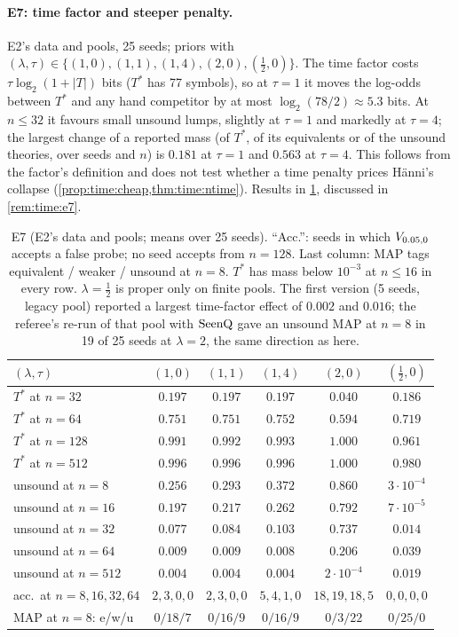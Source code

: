 \paragraph{E7: time factor and steeper penalty.} E2's data and pools, 25 seeds; priors with $(\lambda,\tau)\in\{(1,0),(1,1),(1,4),(2,0),(\tfrac12,0)\}$. The time factor costs $\tau\log_2(1+|T|)$ bits ($T^*$ has 77 symbols), so at $\tau=1$ it moves the log-odds between $T^*$ and any hand competitor by at most $\log_2(78/2)\approx5.3$ bits. At $n\le32$ it favours small unsound lumps, slightly at $\tau=1$ and markedly at $\tau=4$; the largest change of a reported mass (of $T^*$, of its equivalents or of the unsound theories, over seeds and $n$) is $0.181$ at $\tau=1$ and $0.563$ at $\tau=4$. This follows from the factor's definition and does not test whether a time penalty prices H\"anni's collapse (\cref{prop:time:cheap,thm:time:ntime}). Results in \cref{tab:exp:e7}, discussed in \cref{rem:time:e7}.

\begin{table}[ht]
\centering\footnotesize
\begin{tabular}{@{}lccccc@{}}
\toprule
$(\lambda,\tau)$ & $(1,0)$ & $(1,1)$ & $(1,4)$ & $(2,0)$ & $(\tfrac12,0)$\\
\midrule
$T^*$ at $n=32$ & $0.197$ & $0.197$ & $0.197$ & $0.040$ & $0.186$\\
$T^*$ at $n=64$ & $0.751$ & $0.751$ & $0.752$ & $0.594$ & $0.719$\\
$T^*$ at $n=128$ & $0.991$ & $0.992$ & $0.993$ & $1.000$ & $0.961$\\
$T^*$ at $n=512$ & $0.996$ & $0.996$ & $0.996$ & $1.000$ & $0.980$\\
unsound at $n=8$ & $0.256$ & $0.293$ & $0.372$ & $0.860$ & $3\cdot10^{-4}$\\
unsound at $n=16$ & $0.197$ & $0.217$ & $0.262$ & $0.792$ & $7\cdot10^{-5}$\\
unsound at $n=32$ & $0.077$ & $0.084$ & $0.103$ & $0.737$ & $0.014$\\
unsound at $n=64$ & $0.009$ & $0.009$ & $0.008$ & $0.206$ & $0.039$\\
unsound at $n=512$ & $0.004$ & $0.004$ & $0.004$ & $2\cdot10^{-4}$ & $0.019$\\
acc.\ at $n=8,16,32,64$ & $2,3,0,0$ & $2,3,0,0$ & $5,4,1,0$ & $18,19,18,5$ & $0,0,0,0$\\
MAP at $n=8$: e/w/u & $0/18/7$ & $0/16/9$ & $0/16/9$ & $0/3/22$ & $0/25/0$\\
\bottomrule
\end{tabular}
\caption{E7 (E2's data and pools; means over 25 seeds). ``Acc.'': seeds in which $V_{0.05,0}$ accepts a false probe; no seed accepts from $n=128$. Last column: MAP tags equivalent / weaker / unsound at $n=8$. $T^*$ has mass below $10^{-3}$ at $n\le16$ in every row. $\lambda=\tfrac12$ is proper only on finite pools. The first version (5 seeds, legacy pool) reported a largest time-factor effect of $0.002$ and $0.016$; the referee's re-run of that pool with $\mathrm{SeenQ}$ gave an unsound MAP at $n=8$ in 19 of 25 seeds at $\lambda=2$, the same direction as here.}
\label{tab:exp:e7}
\end{table}

